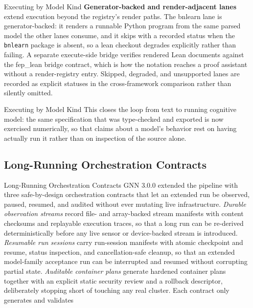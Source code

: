 \documentclass[
  ignorenonframetext,
]{beamer}
\begin{document}
\begin{frame}{Executing by Model Kind}
\textbf{Generator-backed and render-adjacent lanes} extend execution
beyond the registry's render paths. The bnlearn lane is
generator-backed: it renders a runnable Python program from the same
parsed model the other lanes consume, and it skips with a recorded
status when the \texttt{bnlearn} package is absent, so a lean checkout
degrades explicitly rather than failing. A separate execute-side bridge
verifies rendered Lean documents against the fep\_lean bridge contract,
which is how the notation reaches a proof assistant without a
render-registry entry. Skipped, degraded, and unsupported lanes are
recorded as explicit statuses in the cross-framework comparison rather
than silently omitted.

\end{frame}

\begin{frame}{Executing by Model Kind}
This closes the loop from text to running cognitive model: the same
specification that was type-checked and exported is now exercised
numerically, so that claims about a model's behavior rest on having
actually run it rather than on inspection of the source alone.
\end{frame}

\subsection{Long-Running Orchestration
Contracts}\label{long-running-orchestration-contracts}

\begin{frame}{Long-Running Orchestration
Contracts}
GNN 3.0.0 extended the pipeline with three safe-by-design orchestration
contracts that let an extended run be observed, paused, resumed, and
audited without ever mutating live infrastructure. \emph{Durable
observation streams} record file- and array-backed stream manifests with
content checksums and replayable execution traces, so that a long run
can be re-derived deterministically before any live sensor or
device-backed stream is introduced. \emph{Resumable run sessions} carry
run-session manifests with atomic checkpoint and resume, status
inspection, and cancellation-safe cleanup, so that an extended
model-family acceptance run can be interrupted and resumed without
corrupting partial state. \emph{Auditable container plans} generate
hardened container plans together with an explicit static security
review and a rollback descriptor, deliberately stopping short of
touching any real cluster. Each contract only generates and validates
\end{frame}
\end{document}
